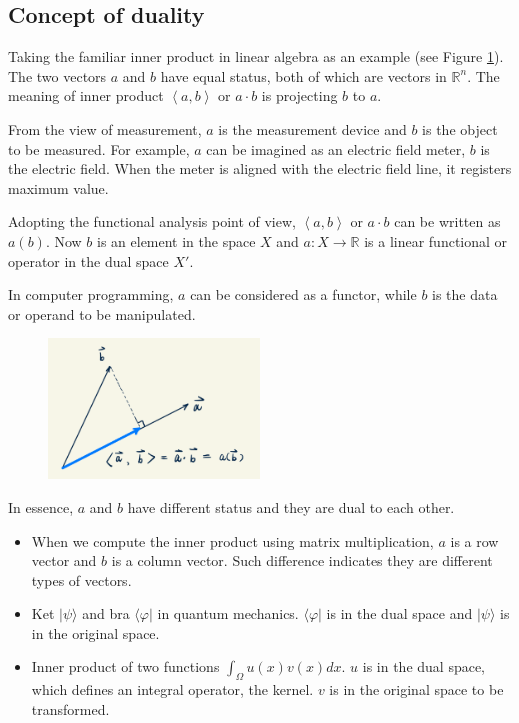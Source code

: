 \documentclass[11pt, a4paper]{book}
\begin{document}
\subsection{Concept of duality}
\label{sec:duality-concept}

Taking the familiar inner product in linear algebra as an example (see Figure
\ref{fig:inner-product-of-vectors}). The two vectors $a$ and $b$ have equal status, both
of which are vectors in $\mathbb{R}^n$. The meaning of inner product
$\left\langle a,b \right\rangle$ or $a\cdot b$ is projecting $b$ to $a$.

From the view of measurement, $a$ is the measurement device and $b$ is the object to be
measured. For example, $a$ can be imagined as an electric field meter, $b$ is the electric
field. When the meter is aligned with the electric field line, it registers maximum value.

Adopting the functional analysis point of view, $\left\langle a,b \right\rangle$ or
$a\cdot b$ can be written as $a(b)$. Now $b$ is an element in the space $X$ and
$a: X \rightarrow \mathbb{R}$ is a linear functional or operator in the dual space $X'$.

In computer programming, $a$ can be considered as a functor, while $b$ is the data or
operand to be manipulated.
\begin{figure}[htbp]
  \centering
  \includegraphics[width=0.5\textwidth, height=\textheight, keepaspectratio]{figures/inner-product-of-vectors-draft}
  \caption{}
  \label{fig:inner-product-of-vectors}
\end{figure}

In essence, $a$ and $b$ have different status and they are dual to each other.

\begin{Example}[Duality]  
  \begin{itemize}
  \item When we compute the inner product using matrix multiplication, $a$ is a row vector
    and $b$ is a column vector. Such difference indicates they are different types of
    vectors.
  \item Ket $|\psi\rangle$ and bra $\langle \varphi |$ in quantum mechanics.
    $\langle \varphi |$ is in the dual space and $|\psi\rangle$ is in the original space.
  \item Inner product of two functions $\int_\Omega u(x)v(x) dx$. $u$ is in the dual space,
    which defines an integral operator, the kernel. $v$ is in the original space to be
    transformed.
  \end{itemize}
\end{Example}
\end{document}
